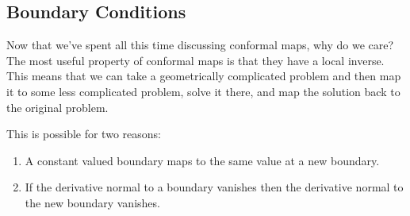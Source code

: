 \documentclass{article}
\begin{document}
    \subsection{Boundary Conditions}
    Now that we've spent all this time discussing conformal maps, why do we care?
    The most useful property of conformal maps is that they have a local inverse.
    This means that we can take a geometrically complicated problem and then map it to some less complicated problem, solve it there, and map the solution back to the original problem.
    
    This is possible for two reasons:
    \begin{enumerate}
        \item A constant valued boundary maps to the same value at a new boundary.
        \item If the derivative normal to a boundary vanishes then the derivative normal to the new boundary vanishes.
    \end{enumerate}
\end{document}
